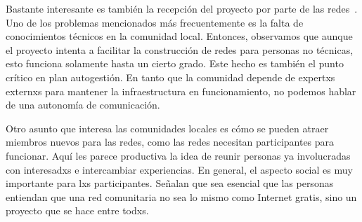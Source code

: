 Bastante interesante es también la recepción del proyecto por parte de las redes~\autocite{AlterMundi2017}.
Uno de los problemas mencionados más frecuentemente es la falta de conocimientos técnicos en la comunidad local.
Entonces, observamos que aunque el proyecto intenta a facilitar la construcción de redes para personas no técnicas, esto funciona solamente hasta un cierto grado.
Este hecho es también el punto crítico en plan autogestión.
En tanto que la comunidad depende de expertxs externxs para mantener la infraestructura en funcionamiento, no podemos hablar de una autonomía de comunicación.

Otro asunto que interesa las comunidades locales es cómo se pueden atraer miembros nuevos para las redes, como las redes necesitan participantes para funcionar.
Aquí les parece productiva la idea de reunir personas ya involucradas con interesadxs e intercambiar experiencias.
En general, el aspecto social es muy importante para lxs participantes.
Señalan que sea esencial que las personas entiendan que una red comunitaria no sea lo mismo como Internet gratis, sino un proyecto que se hace entre todxs.

